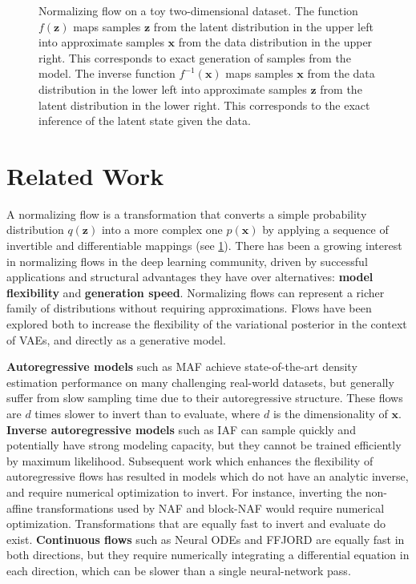 \begin{figure}[!htb]
\begin{center}
{      }
    \caption{Normalizing flow on a toy two-dimensional dataset. 
    The function $f(\mathbf{z})$ maps samples $\mathbf{z}$ from the latent distribution in the upper left into approximate samples $\mathbf{x}$ from the data distribution in the upper right. This corresponds to exact generation of samples from the model.
    The inverse function $f^{-1}(\mathbf{x})$ maps samples $\mathbf{x}$ from the data distribution in the lower left into approximate samples $\mathbf{z}$ from the latent distribution in the lower right. This corresponds to the exact inference of the latent state given the data. 
    }
    \label{fig:normalizing_flow_example_0}
    \end{center}
\end{figure}

\section{Related Work}\label{sec:related_work}

A normalizing flow is a transformation that converts a simple probability distribution $q(\mathbf{z})$  into a more complex one $p(\mathbf{x})$ by applying a sequence of invertible and differentiable mappings \cite{Papamakarios2021} (see \cref{fig:normalizing_flow_example_0}). 
There has been a growing interest in normalizing flows in the deep learning community, driven by successful applications and structural advantages they have over alternatives: \textbf{model flexibility} and \textbf{generation speed}. Normalizing flows can represent a richer family of distributions without requiring approximations. Flows have been explored both to increase the flexibility of the variational posterior in the context of VAEs, and directly as a generative model. 

\textbf{Autoregressive models} such as MAF \cite{papamakarios2017masked} achieve state-of-the-art density estimation performance on many challenging real-world datasets, but generally suffer from slow sampling time due to their autoregressive structure. These flows are $d$ times slower to invert than to evaluate, where $d$ is the dimensionality of $\mathbf{x}$. 
\textbf{Inverse autoregressive models} such as IAF \cite{kingma2016improved} can sample quickly and potentially have strong modeling capacity, but they cannot be trained efficiently by maximum likelihood.
Subsequent work which enhances the flexibility of autoregressive flows has resulted in models which do not have an analytic inverse, and require numerical optimization to invert. For instance, inverting the non-affine transformations used by NAF \cite{huang2018neural} and block-NAF \cite{de2020block} would require numerical optimization.
Transformations that are equally fast to invert and evaluate do exist. 
\textbf{Continuous flows} such as Neural ODEs \cite{chen2019neural} and FFJORD \cite{Grathwohl2019} are equally fast in both directions, but they require numerically integrating a differential equation in each direction, which can be slower than a single neural-network pass.

